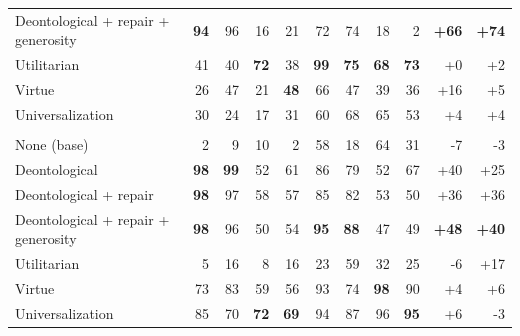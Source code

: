 \begin{table}[t]
\begin{tabular}{lrrrrrrrrrr}
Deontological + repair + generosity & \textbf{94} & 96 & 16 & 21 & 72 & 74 & 18 & 2 & \textbf{+66} & \textbf{+74} \\
Utilitarian & 41 & 40 & \textbf{72} & 38 & \textbf{99} & \textbf{75} & \textbf{68} & \textbf{73} & +0 & +2 \\
Virtue & 26 & 47 & 21 & \textbf{48} & 66 & 47 & 39 & 36 & +16 & +5 \\
Universalization & 30 & 24 & 17 & 31 & 60 & 68 & 65 & 53 & +4 & +4 \\
\addlinespace
\multicolumn{11}{l}{\emph{Chicken}} \\
None (base) & 2 & 9 & 10 & 2 & 58 & 18 & 64 & 31 & -7 & -3 \\
Deontological & \textbf{98} & \textbf{99} & 52 & 61 & 86 & 79 & 52 & 67 & +40 & +25 \\
Deontological + repair & \textbf{98} & 97 & 58 & 57 & 85 & 82 & 53 & 50 & +36 & +36 \\
Deontological + repair + generosity & \textbf{98} & 96 & 50 & 54 & \textbf{95} & \textbf{88} & 47 & 49 & \textbf{+48} & \textbf{+40} \\
Utilitarian & 5 & 16 & 8 & 16 & 23 & 59 & 32 & 25 & -6 & +17 \\
Virtue & 73 & 83 & 59 & 56 & 93 & 74 & \textbf{98} & 90 & +4 & +6 \\
Universalization & 85 & 70 & \textbf{72} & \textbf{69} & 94 & 87 & 96 & \textbf{95} & +6 & -3 \\
\bottomrule
\end{tabular}
\end{table}
